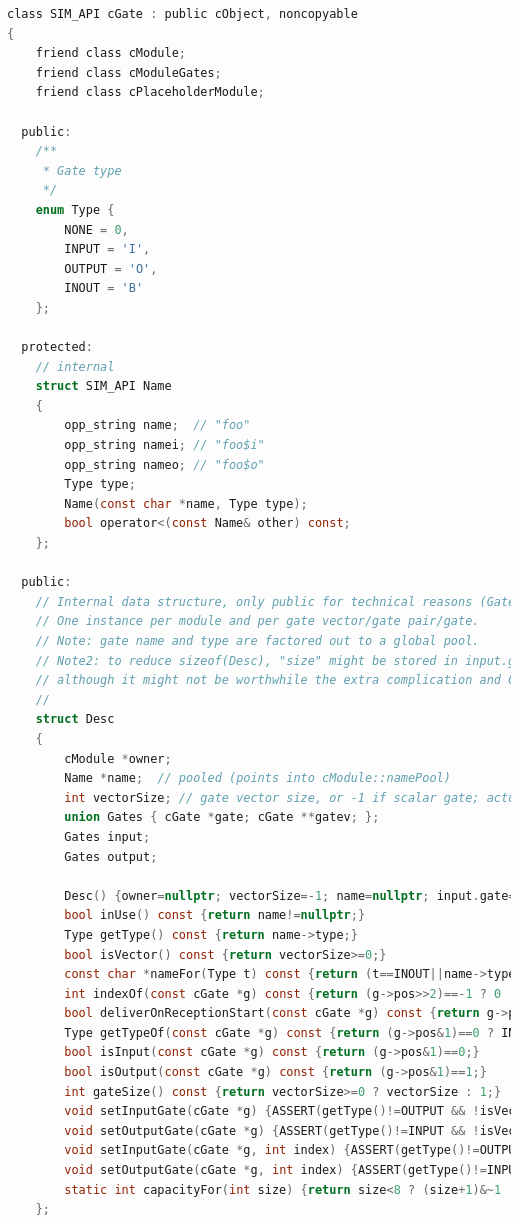\begin{lstlisting}[language=c]
class SIM_API cGate : public cObject, noncopyable
{
    friend class cModule;
    friend class cModuleGates;
    friend class cPlaceholderModule;

  public:
    /**
     * Gate type
     */
    enum Type {
        NONE = 0,
        INPUT = 'I',
        OUTPUT = 'O',
        INOUT = 'B'
    };

  protected:
    // internal
    struct SIM_API Name
    {
        opp_string name;  // "foo"
        opp_string namei; // "foo$i"
        opp_string nameo; // "foo$o"
        Type type;
        Name(const char *name, Type type);
        bool operator<(const Name& other) const;
    };

  public:
    // Internal data structure, only public for technical reasons (GateIterator).
    // One instance per module and per gate vector/gate pair/gate.
    // Note: gate name and type are factored out to a global pool.
    // Note2: to reduce sizeof(Desc), "size" might be stored in input.gatev[0],
    // although it might not be worthwhile the extra complication and CPU cycles.
    //
    struct Desc
    {
        cModule *owner;
        Name *name;  // pooled (points into cModule::namePool)
        int vectorSize; // gate vector size, or -1 if scalar gate; actually allocated size is capacityFor(size)
        union Gates { cGate *gate; cGate **gatev; };
        Gates input;
        Gates output;

        Desc() {owner=nullptr; vectorSize=-1; name=nullptr; input.gate=output.gate=nullptr;}
        bool inUse() const {return name!=nullptr;}
        Type getType() const {return name->type;}
        bool isVector() const {return vectorSize>=0;}
        const char *nameFor(Type t) const {return (t==INOUT||name->type!=INOUT) ? name->name.c_str() : t==INPUT ? name->namei.c_str() : name->nameo.c_str();}
        int indexOf(const cGate *g) const {return (g->pos>>2)==-1 ? 0 : g->pos>>2;}
        bool deliverOnReceptionStart(const cGate *g) const {return g->pos&2;}
        Type getTypeOf(const cGate *g) const {return (g->pos&1)==0 ? INPUT : OUTPUT;}
        bool isInput(const cGate *g) const {return (g->pos&1)==0;}
        bool isOutput(const cGate *g) const {return (g->pos&1)==1;}
        int gateSize() const {return vectorSize>=0 ? vectorSize : 1;}
        void setInputGate(cGate *g) {ASSERT(getType()!=OUTPUT && !isVector()); input.gate=g; g->desc=this; g->pos=(-(1<<2));}
        void setOutputGate(cGate *g) {ASSERT(getType()!=INPUT && !isVector()); output.gate=g; g->desc=this; g->pos=(-(1<<2))|1;}
        void setInputGate(cGate *g, int index) {ASSERT(getType()!=OUTPUT && isVector()); input.gatev[index]=g; g->desc=this; g->pos=(index<<2);}
        void setOutputGate(cGate *g, int index) {ASSERT(getType()!=INPUT && isVector()); output.gatev[index]=g; g->desc=this; g->pos=(index<<2)|1;}
        static int capacityFor(int size) {return size<8 ? (size+1)&~1 : size<32 ? (size+3)&~3 : size<256 ? (size+15)&~15 : (size+63)&~63;}
    };


\end{lstlisting}
